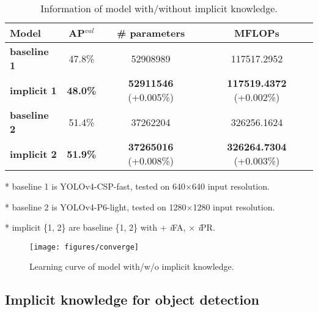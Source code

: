\documentclass[10pt,twocolumn,letterpaper]{article}
\begin{document}
\begin{table}[h]
	\vspace{-2mm}
	\centering
	\begin{threeparttable}[h]
		\footnotesize
		\caption{Information of model with/without implicit knowledge.}
		\label{table:pf}
		\setlength\tabcolsep{3.5pt}
		\begin{tabular}{lccc}
			\toprule
			\textbf{Model} & \textbf{AP$^{val}$} & \textbf{\# parameters} & \textbf{MFLOPs} \\				
			\midrule
			\textbf{baseline 1} & 47.8\% & 52908989 & 117517.2952 \\
			\textbf{implicit 1} & \textbf{48.0\%} & \textbf{52911546} (+0.005\%) & \textbf{117519.4372} (+0.002\%) \\	
			\midrule
			\textbf{baseline 2} & 51.4\% & 37262204 & 326256.1624 \\
			\textbf{implicit 2} & \textbf{51.9\%} & \textbf{37265016} (+0.008\%) & \textbf{326264.7304} (+0.003\%) \\		
			\bottomrule
		\end{tabular}
		\begin{tablenotes}[flushleft]
			\footnotesize
			\item[*] baseline 1 is YOLOv4-CSP-fast, tested on 640$\times$640 input resolution.
			\item[*] baseline 2 is YOLOv4-P6-light, tested on 1280$\times$1280 input resolution.
			\item[*] implicit \{1, 2\} are baseline \{1, 2\} with + \textit{i}FA, $\times$ \textit{i}PR.
		\end{tablenotes}
	\end{threeparttable}
    \vspace{-2mm}
\end{table}

\begin{figure}[h]
	\vspace{-4mm}
	\begin{center}
		\texttt{[image: figures/converge]}
	\end{center}
	\vspace{2mm}
	\caption{Learning curve of model with/w/o implicit knowledge.}
	\label{fig:con}
	\vspace{-2mm}
\end{figure}
 
\newpage

\subsection{Implicit knowledge for object detection}
\label{sec:od}
\end{document}
